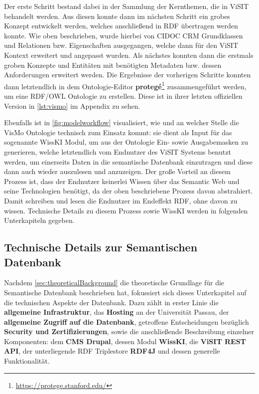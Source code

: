 Der erste Schritt bestand dabei in der Sammlung der Kernthemen, die in ViSIT behandelt werden. Aus diesen konnte dann im nächsten Schritt ein grobes Konzept entwickelt werden, welches anschließend in RDF übertragen werden konnte. Wie oben beschrieben, wurde hierbei von CIDOC CRM Grundklassen und Relationen bzw. Eigenschaften ausgegangen, welche dann für den ViSIT Kontext erweitert und angepasst wurden. Als nächstes konnten dann die erstmals groben Konzepte und Entitäten mit benötigten Metadaten bzw. dessen Anforderungen erweitert werden. Die Ergebnisse der vorherigen Schritte konnten dann letztendlich in dem Ontologie-Editor \textbf{protegé}\footnote{\url{https://protege.stanford.edu/}} zusammengeführt werden, um eine RDF/OWL Ontologie zu erstellen. Diese ist in ihrer letzten offiziellen Version in \autoref{lst:vismo} im Appendix zu sehen.

Ebenfalls ist in \autoref{fig:modelworkflow} visualisiert, wie und an welcher Stelle die VisMo Ontologie technisch zum Einsatz kommt: sie dient als Input für das sogenannte WissKI Modul, um aus der Ontologie Ein- sowie Ausgabemasken zu generieren, welche letztendlich vom Endnutzer des ViSIT Systems benutzt werden, um einerseits Daten in die semantische Datenbank einzutragen und diese dann auch wieder auszulesen und anzuzeigen. Der große Vorteil an diesem Prozess ist, dass der Endnutzer keinerlei Wissen über das Semantic Web und seine Technologien benötigt, da der oben beschriebene Prozess davon abstrahiert. Damit schreiben und lesen die Endnutzer im Endeffekt RDF, ohne davon zu wissen. Technische Details zu diesem Prozess sowie WissKI werden in folgenden Unterkapiteln gegeben.

\subsection{Technische Details zur Semantischen Datenbank}\label{sec:technicalBackground}

Nachdem \autoref{sec:theoreticalBackground} die theoretische Grundlage für die Semantische Datenbank beschrieben hat, fokussiert sich dieses Unterkapitel auf die technischen Aspekte der Datenbank. Dazu zählt in erster Linie die \textbf{allgemeine Infrastruktur}, das \textbf{Hosting} an der Universität Passau, der \textbf{allgemeine Zugriff auf die Datenbank}, getroffene Entscheidungen bezüglich \textbf{Security und Zertifizierungen}, sowie die anschließende Beschreibung einzelner Komponenten: dem \textbf{CMS Drupal}, dessen Modul \textbf{WissKI}, die \textbf{ViSIT REST API}, der unterliegende RDF Triplestore \textbf{RDF4J} und dessen generelle Funktionalität.

